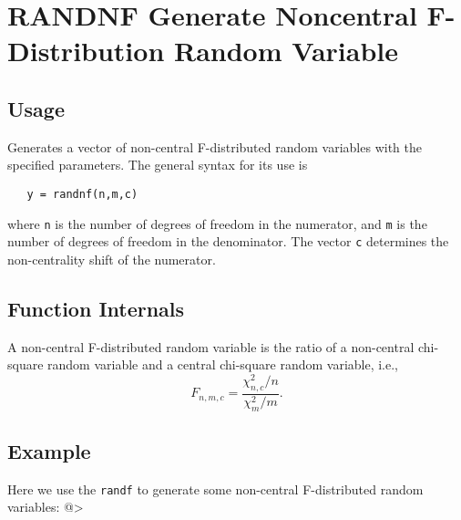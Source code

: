 \section{RANDNF Generate Noncentral F-Distribution Random Variable}

\subsection{Usage}

Generates a vector of non-central F-distributed random variables
with the specified parameters.  The general syntax for its use is
\begin{verbatim}
   y = randnf(n,m,c)
\end{verbatim}
where \verb|n| is the number of degrees of freedom in the numerator,
and \verb|m| is the number of degrees of freedom in the denominator.
The vector \verb|c| determines the non-centrality shift of the numerator.
\subsection{Function Internals}

A non-central F-distributed random variable is the ratio of a
non-central chi-square random variable and a central chi-square random
variable, i.e.,
\[
   F_{n,m,c} = \frac{\chi_{n,c}^2/n}{\chi_m^2/m}.
\]
\subsection{Example}

Here we use the \verb|randf| to generate some non-central F-distributed
random variables:
@>
